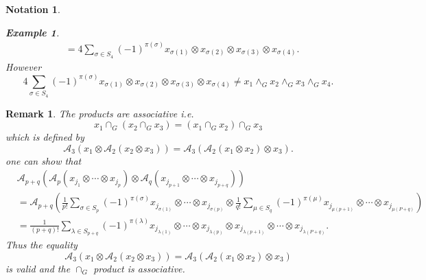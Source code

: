 \documentclass[aps,preprint]{revtex4}%
\newtheorem{example}[theorem]{Example}
\newtheorem{notation}[theorem]{Notation}
\newtheorem{remark}[theorem]{Remark}
\begin{document}
\begin{notation}
\begin{example}
\begin{align}
&  =4\sum_{\sigma\in S_{4}}\left(  -1\right)  ^{\pi\left(  \sigma\right)
}x_{\sigma\left(  1\right)  }\otimes x_{\sigma\left(  2\right)  }\otimes
x_{\sigma\left(  3\right)  }\otimes x_{\sigma\left(  4\right)  }.
\end{align}
However
\begin{equation}
4\sum_{\sigma\in S_{4}}\left(  -1\right)  ^{\pi\left(  \sigma\right)
}x_{\sigma\left(  1\right)  }\otimes x_{\sigma\left(  2\right)  }\otimes
x_{\sigma\left(  3\right)  }\otimes x_{\sigma\left(  4\right)  }\neq
x_{1}\wedge_{G}x_{2}\wedge_{G}x_{3}\wedge_{G}x_{4}.
\end{equation}

\end{example}
\end{notation}

\begin{remark}
The products are associative i.e.
\begin{equation}
x_{1}\cap_{G}\left(  x_{2}\cap_{G}x_{3}\right)  =\left(  x_{1}\cap_{G}%
x_{2}\right)  \cap_{G}x_{3}%
\end{equation}
which is defined by
\begin{equation}
\mathcal{A}_{3}\left(  x_{1}\otimes\mathcal{A}_{2}\left(  x_{2}\otimes
x_{3}\right)  \right)  =\mathcal{A}_{3}\left(  \mathcal{A}_{2}\left(
x_{1}\otimes x_{2}\right)  \otimes x_{3}\right)  .
\end{equation}
one can show that
\begin{align}
&  \mathcal{A}_{p+q}\left(  \mathcal{A}_{p}\left(  x_{j_{1}}\otimes
\cdots\otimes x_{j_{p}}\right)  \otimes\mathcal{A}_{q}\left(  x_{j_{p+1}%
}\otimes\cdots\otimes x_{j_{p+q}}\right)  \right) \\
&  =\mathcal{A}_{p+q}\left(  \frac{1}{p!}\sum_{\sigma\in S_{p}}\left(
-1\right)  ^{\pi\left(  \sigma\right)  }x_{j_{\sigma\left(  1\right)  }%
}\otimes\cdots\otimes x_{j_{\sigma\left(  p\right)  }}\otimes\frac{1}{q!}%
\sum_{\mu\in S_{q}}\left(  -1\right)  ^{\pi\left(  \mu\right)  }%
x_{j_{\mu\left(  p+1\right)  }}\otimes\cdots\otimes x_{j_{\mu\left(
P+q\right)  }}\right) \\
&  =\frac{1}{\left(  p+q\right)  !}\sum_{\lambda\in S_{p+q}}\left(  -1\right)
^{\pi\left(  \lambda\right)  }x_{j_{\lambda\left(  1\right)  }}\otimes
\cdots\otimes x_{j_{\lambda\left(  p\right)  }}\otimes x_{j_{\lambda\left(
p+1\right)  }}\otimes\cdots\otimes x_{j_{\lambda\left(  P+q\right)  }}.
\end{align}
Thus the equality
\begin{equation}
\mathcal{A}_{3}\left(  x_{1}\otimes\mathcal{A}_{2}\left(  x_{2}\otimes
x_{3}\right)  \right)  =\mathcal{A}_{3}\left(  \mathcal{A}_{2}\left(
x_{1}\otimes x_{2}\right)  \otimes x_{3}\right)
\end{equation}
is valid and the $\cap_{G}$ product is associative.
\end{remark}
\end{document}
